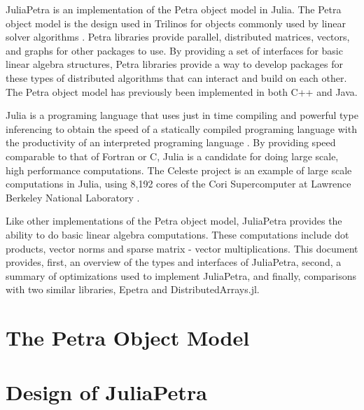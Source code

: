 \documentclass[acmsmall]{acmart}
\begin{document}
	JuliaPetra is an implementation of the Petra object model in Julia.
	The Petra object model is the design used in Trilinos for objects commonly used by linear solver algorithms
	\cite{Heroux:2005:Trilinos}.
	Petra libraries provide parallel, distributed matrices, vectors, and graphs for other packages to use.
	By providing a set of interfaces for basic linear algebra structures, Petra libraries provide a way
	to develop packages for these types of distributed algorithms that can interact and build on each other.
	The Petra object model has previously been implemented in both C++ and Java.
	
	Julia is a programing language that uses just in time compiling and powerful type inferencing
	to obtain the speed of a statically compiled programing language with the productivity of an
	interpreted programing language \cite{Bezanson:2017:FreshApproach}.
	By providing speed comparable to that of Fortran or C, Julia is a candidate for doing large scale,
	high performance computations.
	The Celeste project is an example of large scale computations in Julia,
	using 8,192 cores of the Cori Supercomputer
	at Lawrence Berkeley National Laboratory \cite{Bezanson:2017:FreshApproach}.
	
	Like other implementations of the Petra object model,
	JuliaPetra provides the ability to do basic linear algebra computations.
	These computations include dot products, vector norms and sparse matrix - vector multiplications.
	This document provides, first, an overview of the types and interfaces of JuliaPetra,
	second, a summary of optimizations used to implement JuliaPetra,
	and finally, comparisons with two similar libraries, Epetra and DistributedArrays.jl.
	
	\section{The Petra Object Model}
	
	
	\section{Design of JuliaPetra}
	
\end{document}
